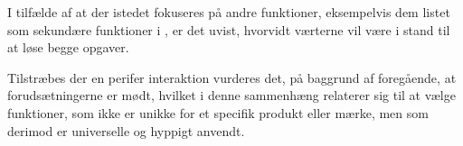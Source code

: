 I tilfælde af at der istedet fokuseres på andre funktioner, eksempelvis dem listet som sekundære funktioner i , er det uvist, hvorvidt værterne vil være i stand til at løse begge opgaver. 

Tilstræbes der en perifer interaktion vurderes det, på baggrund af foregående, at forudsætningerne er mødt, hvilket i denne sammenhæng relaterer sig til at vælge funktioner, som ikke er unikke for et specifik produkt eller mærke, men som derimod er universelle og hyppigt anvendt. 
%
